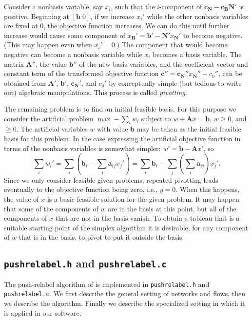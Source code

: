 \documentclass[12pt]{article}
\theoremstyle{definition}
\newcommand{\ba}{\mathbf{a}}
\newcommand{\bb}{\mathbf{b}}
\newcommand{\bc}{\mathbf{c}}
\newcommand{\bA}{\mathbf{A}}
\newcommand{\bB}{\mathbf{B}}
\newcommand{\bN}{\mathbf{N}}
\begin{document}
\begin{appendix}
Consider a nonbasis variable, say $x_i$, such that the $i$-component
of $\bc_\bN - \bc_\bB \bN'$ is positive.  Beginning at $[\bb \; 0]$,
if we increase $x_i'$ while the other nonbasis variables are fixed at
$0$, the objective function increases.  We can do this until further
increase would cause some component of $x_\bB' = \bb' - \bN' x_\bN'$
to become negative.  (This may happen even when $x_i' = 0$.)  The
component that would become negative can become a nonbasis variable
while $x_i$ becomes a basis variable.  The matrix $\bA''$, the value
$\bb''$ of the new basis variables, and the coefficient vector and
constant term of the transformed objective function $\bc'' = \bc_\bN''
x_\bN'' + c_0''$, can be obtained from $\bA'$, $\bb'$, $\bc_\bN'$, and
$c_0'$ by conceptually simple (but tedious to write out) algebraic
manipulations.  This process is called \emph{pivotting}.

The remaining problem is to find an initial feasible basis.  For this
purpose we consider the artificial problem $\max - \sum_i w_i$ subject
to $w + \bA x = \bb$, $w \ge 0$, and $ \ge 0$.  The artificial
variables $w$ with value $\bb$ may be taken as the initial feasible
basis for this problem.  In the case expressing the artificial
objective function in terms of the nonbasis variables is somewhat
simpler: $w' = \bb - \bA x'$, so $$\sum_i w_i' = \sum_i (\bb_i -
\sum_j \ba_{ij} x_j') = \sum_i \bb_i - \sum_j (\sum_i \ba_{ij})x_j'.$$
Since we only consider feasible given problems, repeated pivotting
leads eventually to the objective function being zero, i.e., $y = 0$.
When this happens, the value of $x$ is a basic feasible solution for
the given problem.  It may happen that some of the components of $w$
are in the basis at this point, but all of the components of $x$ that
are not in the basis vanish.  To obtain a tableau that is a suitable
starting point of the simplex algorithm it is desirable, for any
component of $w$ that is in the basis, to pivot to put it outside the
basis.

\subsection{\texttt{pushrelabel.h} and \texttt{pushrelabel.c}}
\label{subsec:PushRelabel}

The push-relabel algorithm of \cite{GoTa88} is implemented in
\texttt{pushrelabel.h} and \texttt{pushrelabel.c}.  We first describe
the general setting of networks and flows, then we describe the
algorithm.  Finally we describe the specialized setting in which it is
applied in our software.


\end{appendix}
\end{document}
